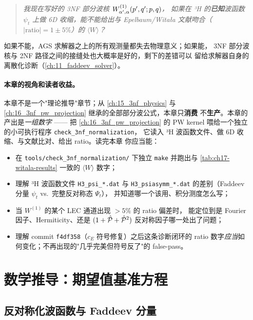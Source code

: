 \begin{quote}
\itshape
我现在写好的 3NF 部分波核 \(W^{(1)}_{\alpha',\alpha}(p',q'; p, q)\)，
如果在 ³H 的\textbf{已知}波函数 \(\psi_t\) 上做 6D 收缩，能不能给出与
Epelbaum/Witała 文献吻合（\(|\text{ratio}|=1\pm 5\%\)）的 \(\langle W\rangle\)？
\end{quote}

如果不能，AGS 求解器之上的所有观测量都失去物理意义；如果能，
3NF 部分波核与 2NF 路径之间的接缝处也大概率是好的，剩下的差错可以
留给求解器自身的离散化诊断（\cref{ch:11_faddeev_solver}）。

\paragraph{本章的视角和读者收益。}
本章不是一个"理论推导"章节；从 \cref{ch:15_3nf_physics} 与
\cref{ch:16_3nf_pw_projection} 继承的全部部分波公式，本章只\textbf{消费}
不\textbf{生产}。本章的产出是\emph{一组数字} —— 把 \cref{ch:16_3nf_pw_projection}
的 PW kernel 喂给一个独立的小可执行程序 \texttt{check\_3nf\_normalization}，
它读入 ³H 波函数文件、做 6D 收缩、与文献比对、给出 ratio。读完本章
你应当能：

\begin{itemize}
  \item 在 \texttt{tools/check\_3nf\_normalization/} 下独立 \texttt{make}
        并跑出与 \cref{tab:ch17-witala-results} 一致的 \(\langle W\rangle\)
        数字；
  \item 理解 ³H 波函数文件 \texttt{H3\_psi\_*.dat} 与 \texttt{H3\_psiasymm\_*.dat}
        的差别（Faddeev 分量 \(\psi_t\) vs.\ 完整反对称态 \(\Psi_t\)），
        并知道哪一个该用、积分测度怎么写；
  \item 当 \(W^{(1)}\) 的某个 LEC 通道出现 \(>5\%\) 的 ratio 偏差时，
        能定位到是 Fourier 因子、Hermiticity、还是 \((1+\hat{\mathcal{P}}+\hat{\mathcal{P}}^2)\)
        反对称因子哪一处出了问题；
  \item 理解 commit \texttt{f4df358}（\(c_E\) 符号修复）之后这条诊断闭环的
        ratio 数字\emph{应当}如何变化；不再出现的"几乎完美但符号反了"的
        false-pass。
\end{itemize}

\section{数学推导：期望值基准方程}
\label{sec:ch17-math}

\subsection{反对称化波函数与 Faddeev 分量}
\label{subsec:ch17-asymm-psi}

